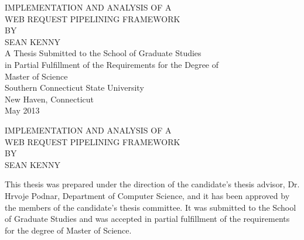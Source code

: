 \documentclass[12pt]{report}
\begin{document}

\newpage
\thispagestyle{empty}
\vspace*{\fill}
\begin{center}
	\large 
	\MakeTextUppercase{Implementation and Analysis of a} \\
	\MakeTextUppercase{Web Request Pipelining Framework} \\ 
	\MakeTextUppercase{By} \\
	\MakeTextUppercase{Sean Kenny} \\
	A Thesis Submitted to the School of Graduate Studies \\
	in Partial Fulfillment of the Requirements for the Degree of \\
	Master of Science \\
	\vspace{.5in}
	Southern Connecticut State University \\
	New Haven, Connecticut \\
	May 2013
\end{center}
\vspace*{\fill}

\newpage
\thispagestyle{plain}
\setcounter{page}{2}
\vspace*{0in}
\begin{center}
	\large 
	\MakeTextUppercase{Implementation and Analysis of a} \\
	\MakeTextUppercase{Web Request Pipelining Framework} \\ 
	\MakeTextUppercase{By} \\
	\MakeTextUppercase{Sean Kenny} \\
\end{center}
This thesis was prepared under the direction of the candidate's thesis advisor, Dr. Hrvoje Podnar, Department of Computer Science, and it has been approved by the members of the candidate's thesis committee. It was submitted to the School of Graduate Studies and was accepted in partial fulfillment of the requirements for the degree of Master of Science.
\end{document}
